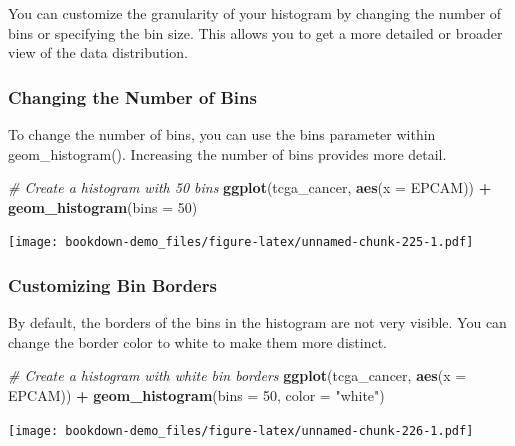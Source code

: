 \documentclass[
]{book}
\newenvironment{Shaded}{\begin{snugshade}}{\end{snugshade}}
\newcommand{\AttributeTok}[1]{\textcolor[rgb]{0.13,0.29,0.53}{#1}}
\newcommand{\CommentTok}[1]{\textcolor[rgb]{0.56,0.35,0.01}{\textit{#1}}}
\newcommand{\DecValTok}[1]{\textcolor[rgb]{0.00,0.00,0.81}{#1}}
\newcommand{\FunctionTok}[1]{\textcolor[rgb]{0.13,0.29,0.53}{\textbf{#1}}}
\newcommand{\NormalTok}[1]{#1}
\newcommand{\SpecialCharTok}[1]{\textcolor[rgb]{0.81,0.36,0.00}{\textbf{#1}}}
\newcommand{\StringTok}[1]{\textcolor[rgb]{0.31,0.60,0.02}{#1}}
\begin{document}
You can customize the granularity of your histogram by changing the number of bins or specifying the bin size. This allows you to get a more detailed or broader view of the data distribution.

\hypertarget{changing-the-number-of-bins}{%
\subsubsection{Changing the Number of Bins}\label{changing-the-number-of-bins}}

To change the number of bins, you can use the bins parameter within geom\_histogram(). Increasing the number of bins provides more detail.

\begin{Shaded}
\begin{Highlighting}[]
\CommentTok{\# Create a histogram with 50 bins}
\FunctionTok{ggplot}\NormalTok{(tcga\_cancer, }\FunctionTok{aes}\NormalTok{(}\AttributeTok{x =}\NormalTok{ EPCAM)) }\SpecialCharTok{+}
  \FunctionTok{geom\_histogram}\NormalTok{(}\AttributeTok{bins =} \DecValTok{50}\NormalTok{)}
\end{Highlighting}
\end{Shaded}

\texttt{[image: bookdown-demo\_files/figure-latex/unnamed-chunk-225-1.pdf]}

\hypertarget{customizing-bin-borders}{%
\subsubsection{Customizing Bin Borders}\label{customizing-bin-borders}}

By default, the borders of the bins in the histogram are not very visible. You can change the border color to white to make them more distinct.

\begin{Shaded}
\begin{Highlighting}[]
\CommentTok{\# Create a histogram with white bin borders}
\FunctionTok{ggplot}\NormalTok{(tcga\_cancer, }\FunctionTok{aes}\NormalTok{(}\AttributeTok{x =}\NormalTok{ EPCAM)) }\SpecialCharTok{+}
  \FunctionTok{geom\_histogram}\NormalTok{(}\AttributeTok{bins =} \DecValTok{50}\NormalTok{, }\AttributeTok{color =} \StringTok{"white"}\NormalTok{)}
\end{Highlighting}
\end{Shaded}

\texttt{[image: bookdown-demo\_files/figure-latex/unnamed-chunk-226-1.pdf]}
\end{document}
